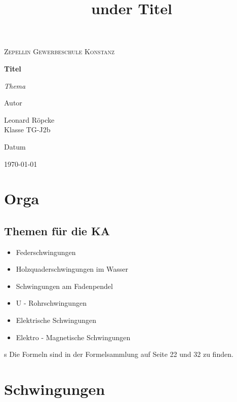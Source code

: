 \documentclass{article}
\title{under Titel}
\newcommand{\AuthorName}{Leonard Röpcke\\Klasse TG-J2b}
\newcommand{\Institute}{Zepellin Gewerbeschule Konstanz}
\newcommand{\Subtitle}{Thema}
\newcommand{\MyDate}{\today}
\begin{document}
\begin{titlepage}
  \centering
  {\scshape\LARGE \Institute \par}
  \vspace{2.5cm}
  {\huge\bfseries Titel\par}
  \vspace{0.8cm}
  {\Large\itshape \Subtitle \par}
  \vfill
  {\Large Autor\par}
  {\Large \AuthorName \par}
  \vspace{1cm}
  {\Large Datum\par}
  {\Large \MyDate \par}
  \vfill
  \vspace{1cm}
  {\small }
\end{titlepage}
\tableofcontents
\newpage


\section{Orga}
\subsection{Themen für die KA}
\begin{itemize}
    \item Federschwingungen
    \item Holzquaderschwingungen im Wasser
    \item Schwingungen am Fadenpendel
    \item U - Rohrschwingungen
    \item Elektrische Schwingungen
    \item Elektro - Magnetische Schwingungen
\end{itemize}s
Die Formeln sind in der Formelsammlung auf Seite 22 und 32 zu finden.

\section{Schwingungen}
\end{document}
